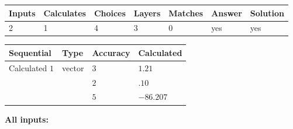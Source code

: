 \documentclass[12pt]{article}
\begin{document}
 
 
\noindent{}
 
 

 
 
\vspace{0.3in}
   
   
   
   
\noindent\begin{tabular}{|l|l|l|l|l|l|l|}
 \hline
Inputs & Calculates & Choices & Layers & Matches & Answer & Solution \\ \hline
           2 & 
           1 & 
           4
  & 
           3 & 
           0 & 
  yes & 
  yes 
  \\ \hline
 \end{tabular}
   
   
   
   
\noindent{}
   
   
  
  
\noindent\begin{tabular}{|l|l|l|l|}
\hline
 Sequential & Type & Accuracy & Calculated \\ 
\hline
 
 
  Calculated $           1$ & vector &  
  $           3 $ 
 &  $ 1.21 $ 
 \\    
  & & 
  $           2 $ 
 &  $ .10 $ 
 \\    
  & & 
  $           5 $ 
 &  $ -86.207 $ 
 \\  \hline  
 \end{tabular}
   
   
   
   
\noindent\vspace{0.1in}\hspace{-0.08in} {\textbf{\Large{All inputs: }}}
   
   
  
\end{document}

